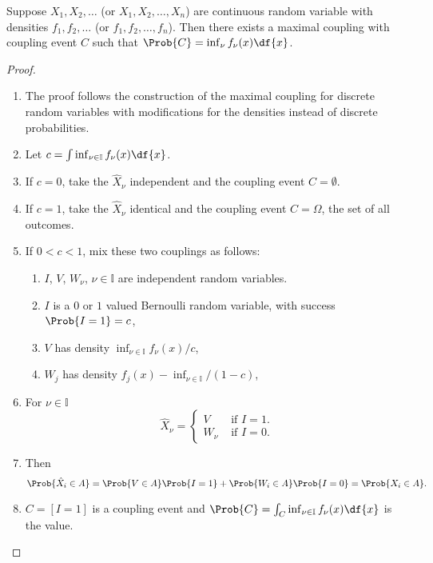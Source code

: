 \documentclass[12pt]{article}
\begin{document}
\begin{theorem}
    Suppose \( X_1, X_2, \dots \) (or \( X_1, X_2, \dots, X_n \)) are
    continuous random variable with densities \( f_1, f_2, \dots \) (or \(
    f_1, f_2, \dots, f_n \)).  Then there exists a maximal coupling with
    coupling event \( C \) such that \( \Prob{C} = \inf_\nu f_\nu(x) \df
    {x} \).
\end{theorem}

\begin{proof}
    \begin{enumerate}
        \item
            The proof follows the construction of the maximal coupling
            for discrete random variables with modifications for the
            densities instead of discrete probabilities.
        \item
            Let \( c = \int \inf_{\nu \in \mathbb{I}} f_\nu(x) \df{x} \).
        \item
            If \( c = 0 \), take the \( \hat{X}_{\nu} \) independent and
            the coupling event \( C = \emptyset \).
        \item
            If \( c = 1 \), take the \( \hat{X}_{\nu} \) identical and
            the coupling event \( C = \Omega \), the set of all
            outcomes.
        \item
            If \( 0 < c < 1 \), mix these two couplings as follows:
            \begin{enumerate}
                \item
                    \( I \), \( V \), \( W_{\nu} \), \( \nu \in \mathbb{I}
                    \) are independent random variables.
                \item
                    \( I \) is a \( 0 \) or \( 1 \) valued Bernoulli
                    random variable, with success \( \Prob{I=1} = c \),
                \item
                    \( V \) has density \( \inf_{\nu \in \mathbb{I}} f_{\nu}
                    (x)/c \),
                \item
                    \( W_j \) has density \( f_j(x) - \inf_{\nu \in
                    \mathbb{I}}/(1-c) \),
            \end{enumerate}
        \item
            For \( \nu \in \mathbb{I} \)
            \[
                \hat{X}_{\nu} =
                \begin{cases}
                    V & \text{ if } I = 1.  \\
                    W_{\nu} & \text{ if } I = 0.
                \end{cases}
            \]
        \item
            Then
            \[
                \Prob{\hat{X}_i \in A} = \Prob{V \in A}\Prob{I = 1} +
                \Prob{W_{i} \in A}\Prob{I = 0} = \Prob{X_{i} \in A}.
            \]
        \item
            \( C = [I = 1] \) is a coupling event and \( \Prob{C} = \int_
            {C} \inf_{\nu \in \mathbb{I}} f_{\nu}(x) \df{x} \) is the
            value.
    \end{enumerate}
\end{proof}
\end{document}
